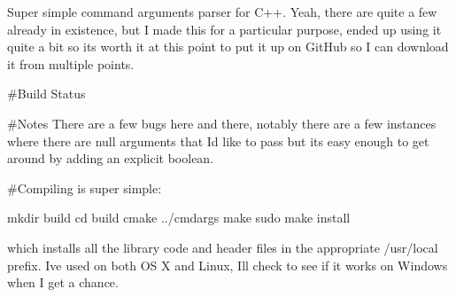 Super simple command arguments parser for C++. Yeah, there are quite a few already in existence, but I made this for a particular purpose, ended up using it quite a bit so it\textquotesingle{}s worth it at this point to put it up on Git\+Hub so I can download it from multiple points.

\#\+Build Status \href{https://travis-ci.org/RaftLib/cmdargs}{\tt }

\#\+Notes There are a few bugs here and there, notably there are a few instances where there are null arguments that I\textquotesingle{}d like to pass but it\textquotesingle{}s easy enough to get around by adding an explicit boolean.

\#\+Compiling is super simple\+:


\begin{DoxyCode}
mkdir build
cd build
cmake ../cmdargs
make
sudo make install
\end{DoxyCode}


which installs all the library code and header files in the appropriate /usr/local prefix. I\textquotesingle{}ve used on both OS X and Linux, I\textquotesingle{}ll check to see if it works on Windows when I get a chance.

